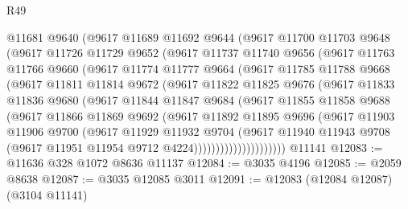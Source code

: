 \begin{lexlean}{R49}
\begin{coremodule}
          @11681
          @9640
          (@9617
            @11689
            @11692
            @9644
            (@9617
              @11700
              @11703
              @9648
              (@9617
                @11726
                @11729
                @9652
                (@9617
                  @11737
                  @11740
                  @9656
                  (@9617
                    @11763
                    @11766
                    @9660
                    (@9617
                      @11774
                      @11777
                      @9664
                      (@9617
                        @11785
                        @11788
                        @9668
                        (@9617
                          @11811
                          @11814
                          @9672
                          (@9617
                            @11822
                            @11825
                            @9676
                            (@9617
                              @11833
                              @11836
                              @9680
                              (@9617
                                @11844
                                @11847
                                @9684
                                (@9617
                                  @11855
                                  @11858
                                  @9688
                                  (@9617
                                    @11866
                                    @11869
                                    @9692
                                    (@9617
                                      @11892
                                      @11895
                                      @9696
                                      (@9617
                                        @11903
                                        @11906
                                        @9700
                                        (@9617
                                          @11929
                                          @11932
                                          @9704
                                          (@9617
                                            @11940
                                            @11943
                                            @9708
                                            (@9617 @11951 @11954 @9712 @4224)))))))))))))))))))))
    @11141
@12083 := @11636 @328 @1072 @8636 @11137
@12084 := @3035 @4196
@12085 := @2059 @8638
@12087 := @3035 @12085 @3011
@12091 := @12083 (@12084 @12087) (@3104 @11141)

\end{coremodule}
\end{lexlean}
